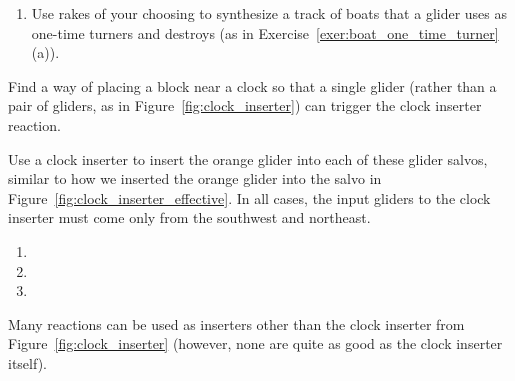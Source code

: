 \begin{multicols}{2}
\begin{problemstar}
\begin{enumerate}[label=\bf\color{ocre}(\alph*)]
			\item Use rakes of your choosing to synthesize a track of boats that a glider uses as one-time turners and destroys (as in Exercise~\ref{exer:boat_one_time_turner}(a)).
		\end{enumerate}
	\end{problemstar}
	
	
	\mfilbreak
	
	
	\begin{problemstar}\label{exer:clock_inserter_block} 
		Find a way of placing a block near a clock so that a single glider (rather than a pair of gliders, as in Figure~\ref{fig:clock_inserter}) can trigger the clock inserter reaction.
	\end{problemstar}
	
	
	\mfilbreak
	
	
	\begin{problemstar}\label{exer:clock_inserter_use} 
		Use a clock inserter to insert the orange glider into each of these glider salvos, similar to how we inserted the orange glider into the salvo in Figure~\ref{fig:clock_inserter_effective}. In all cases, the input gliders to the clock inserter must come only from the southwest and northeast.
		\vspace*{-0.3cm}\begin{multicols}{2}
			\begin{enumerate}[label=\bf\color{ocre}(\alph*)]
				\item[\bf\color{ocre}(a)] 
				
				\item[\bf\color{ocre}(c)] 
				
				\item[\bf\color{ocre}(b)] 
			\end{enumerate}
		\end{multicols}
	\end{problemstar}
	
	
	\mfilbreak
	
	
	\begin{problemstar}\label{exer:other_inserters} 
		Many reactions can be used as inserters other than the clock inserter from Figure~\ref{fig:clock_inserter} (however, none are quite as good as the clock inserter itself).\smallskip
		

\end{problemstar}
\end{multicols}
